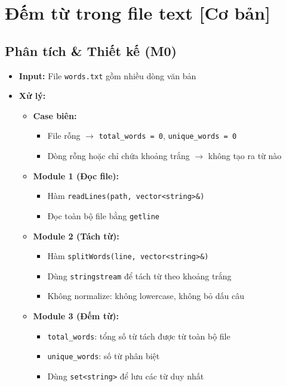 \section{Đếm từ trong file text [Cơ bản]}

\subsection{Phân tích \& Thiết kế (M0)}
    \begin{itemize}
        \item \textbf{Input:} File \texttt{words.txt} gồm nhiều dòng văn bản
        
        \item \textbf{Xử lý:}
        \begin{itemize}
            \item \textbf{Case biên:}
            \begin{itemize}
                \item File rỗng $\rightarrow$ \texttt{total\_words = 0}, \texttt{unique\_words = 0}
                \item Dòng rỗng hoặc chỉ chứa khoảng trắng $\rightarrow$ không tạo ra từ nào
            \end{itemize}

            \item \textbf{Module 1 (Đọc file):}
            \begin{itemize}
                \item Hàm \texttt{readLines(path, vector<string>\&)}
                \item Đọc toàn bộ file bằng \texttt{getline}
            \end{itemize}

            \item \textbf{Module 2 (Tách từ):}
            \begin{itemize}
                \item Hàm \texttt{splitWords(line, vector<string>\&)}
                \item Dùng \texttt{stringstream} để tách từ theo khoảng trắng
                \item Không normalize: không lowercase, không bỏ dấu câu
            \end{itemize}

            \item \textbf{Module 3 (Đếm từ):}
            \begin{itemize}
                \item \texttt{total\_words}: tổng số từ tách được từ toàn bộ file
                \item \texttt{unique\_words}: số từ phân biệt
                \item Dùng \texttt{set<string>} để lưu các từ duy nhất
            \end{itemize}


\end{itemize}
\end{itemize}
